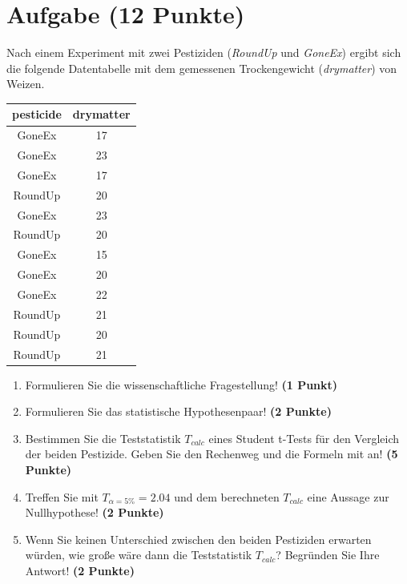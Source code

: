 \documentclass[a4paper, 10pt]{scrartcl}\usepackage[]{graphicx}\usepackage[]{xcolor}
\begin{document}
\section{Aufgabe \hfill (12 Punkte)}

Nach einem Experiment mit zwei Pestiziden (\textit{RoundUp} und
\textit{GoneEx}) ergibt sich die folgende Datentabelle mit dem gemessenen
Trockengewicht (\textit{drymatter}) von Weizen.

\begin{table}[!h]
\centering
\begin{tabular}{cc}
\toprule
pesticide & drymatter\\
\midrule
GoneEx & 17\\
GoneEx & 23\\
GoneEx & 17\\
RoundUp & 20\\
GoneEx & 23\\
\addlinespace
RoundUp & 20\\
GoneEx & 15\\
GoneEx & 20\\
GoneEx & 22\\
RoundUp & 21\\
\addlinespace
RoundUp & 20\\
RoundUp & 21\\
\bottomrule
\end{tabular}
\end{table}



\begin{enumerate}
  \item Formulieren Sie die wissenschaftliche Fragestellung! \textbf{(1 Punkt)}
  \item Formulieren Sie das statistische Hypothesenpaar! \textbf{(2
      Punkte)}
  \item Bestimmen Sie die Teststatistik $T_{calc}$ eines Student t-Tests f{\"u}r den
  Vergleich der beiden Pestizide. Geben Sie den Rechenweg und die Formeln
  mit an! \textbf{(5 Punkte)}
\item Treffen Sie mit $T_{\alpha = 5\%} = 2.04$ und dem berechneten $T_{calc}$ eine Aussage
  zur Nullhypothese! \textbf{(2 Punkte)}
\item Wenn Sie keinen Unterschied zwischen den beiden Pestiziden erwarten
  w{\"u}rden, wie gro{\ss}e w{\"a}re dann die Teststatistik $T_{calc}$? Begr{\"u}nden Sie Ihre
  Antwort! \textbf{(2 Punkte)}
\end{enumerate} 
\clearpage
\end{document}
